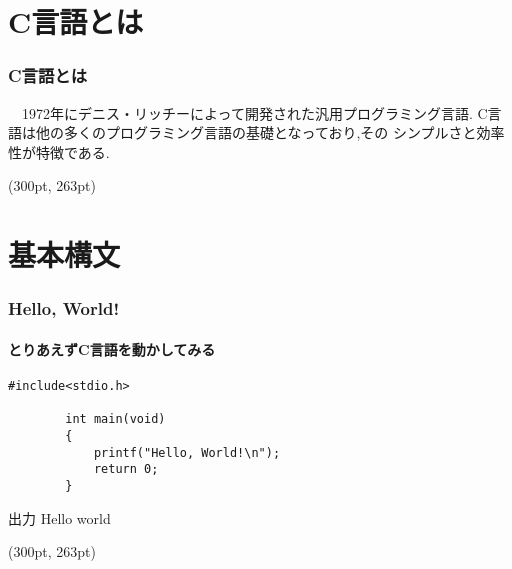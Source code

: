 \documentclass[dvipdfmx]{beamer}
\begin{document}
\section{\textrm{C}言語とは}
\begin{frame}[c, fragile]
    \frametitle{\textrm{C}言語とは}
    　1972年にデニス・リッチーによって開発された汎用プログラミング言語.
    \textrm{C}言語は他の多くのプログラミング言語の基礎となっており,その
    シンプルさと効率性が特徴である.
    \begin{textblock*}{0.3\linewidth}(300pt, 263pt)
    \space
    \end{textblock*}
\end{frame}

\section{基本構文}
\begin{frame}[c, fragile]
    \frametitle{Hello, World!}
    \framesubtitle{とりあえず\textrm{C}言語を動かしてみる}
    \begin{lstlisting}[gobble=8, caption=hello.c, label=hello]
        #include<stdio.h>

        int main(void)
        {
            printf("Hello, World!\n");
            return 0;
        }
    \end{lstlisting}
    \begin{block}{出力}
        Hello world
    \end{block}
    \begin{textblock*}{0.3\linewidth}(300pt, 263pt)
    \space
    \end{textblock*}
\end{frame}
\end{document}

